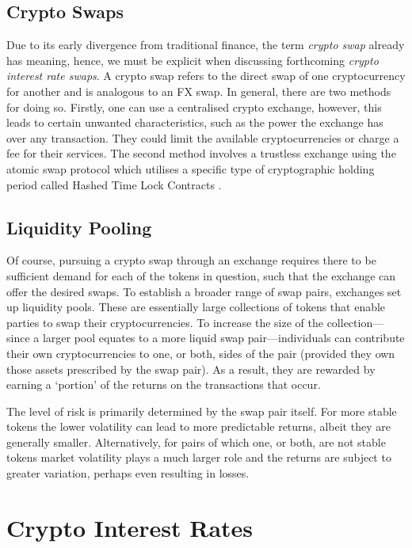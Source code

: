 \subsection{Crypto Swaps}
Due to its early divergence from traditional finance, the term \textit{crypto swap} already has meaning, hence, we must be explicit when discussing forthcoming \textit{crypto interest rate swaps}. A crypto swap refers to the direct swap of one cryptocurrency for another and is analogous to an FX swap. In general, there are two methods for doing so. Firstly, one can use a centralised crypto exchange, however, this leads to certain unwanted characteristics, such as the power the exchange has over any transaction. They could limit the available cryptocurrencies or charge a fee for their services. The second method involves a trustless exchange using the atomic swap protocol which utilises a specific type of cryptographic holding period called Hashed Time Lock Contracts \citep{liu2020atomic}.

\subsection{Liquidity Pooling}
Of course, pursuing a crypto swap through an exchange requires there to be sufficient demand for each of the tokens in question, such that the exchange can offer the desired swaps. To establish a broader range of swap pairs, exchanges set up liquidity pools. These are essentially large collections of tokens that enable parties to swap their cryptocurrencies. To increase the size of the collection––since a larger pool equates to a more liquid swap pair––individuals can contribute their own cryptocurrencies to one, or both, sides of the pair (provided they own those assets prescribed by the swap pair). As a result, they are rewarded by earning a `portion' of the returns on the transactions that occur.

The level of risk is primarily determined by the swap pair itself. For more stable tokens the lower volatility can lead to more predictable returns, albeit they are generally smaller. Alternatively, for pairs of which one, or both, are not stable tokens market volatility plays a much larger role and the returns are subject to greater variation, perhaps even resulting in losses.

\section{Crypto Interest Rates}


